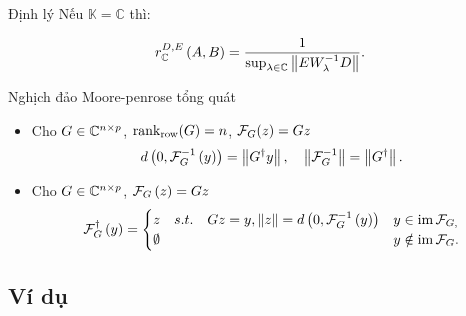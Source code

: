 \begin{frame}{Định lý}
    Nếu $\mathbb{K}=\mathbb{C}$ thì:

    \begin{align}
    r_{\mathbb{C}}^{D,E}\left(A,B\right)=\frac{1}{\sup_{\lambda\in\mathbb{C}}\left\lVert EW_{\lambda}^{-1}D\right\rVert}.\label{eq:3.3}
    \end{align}
\end{frame}

\begin{frame}{Nghịch đảo Moore-penrose tổng quát}
\begin{itemize}
    \item Cho \(G\in\mathbb{C}^{n\times p}\), \(\operatorname{rank}_{\text{row}}(G)=n\), \(\mathcal{F}_{G}(z)=Gz\)
\begin{equation}
d\left(0,\mathcal{F}_{G}^{-1}\left(y\right)\right)=\left\lVert G^{\dagger}y\right\rVert,\quad\left\lVert\mathcal{F}_{G}^{-1}\right\rVert=\left\lVert G^{\dagger}\right\rVert.\label{eq:3.5}
\end{equation}
    \item Cho \(G\in\mathbb{C}^{n\times p}\), \(\mathcal{F}_{G}\left(z\right)=Gz\)
\begin{equation}
\mathcal{F}_{G}^{\dagger}\left(y\right)=\begin{cases}
z\quad s.t.\quad Gz=y,\left\lVert z\right\rVert=d\left(0,\mathcal{F}_{G}^{-1}\left(y\right)\right) & y\in\operatorname{im}\mathcal{F}_{G,}\\
\emptyset & y\notin\operatorname{im}\mathcal{F}_{G}.
\end{cases}\label{eq:3.6}
\end{equation}
\end{itemize}
\end{frame}



\subsection{Ví dụ}



